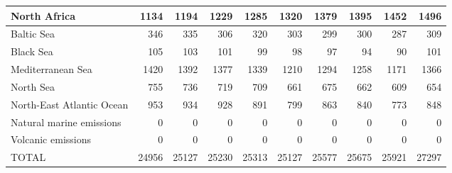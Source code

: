 \begin{table}
\begin{tabular}{|l|r|r|r|r|r|r|r|r|r|}
                  North Africa&   1134&   1194&   1229&   1285&   1320&   1379&   1395&   1452&   1496\\\hline
                    Baltic Sea&    346&    335&    306&    320&    303&    299&    300&    287&    309\\\hline
                     Black Sea&    105&    103&    101&     99&     98&     97&     94&     90&    101\\\hline
             Mediterranean Sea&   1420&   1392&   1377&   1339&   1210&   1294&   1258&   1171&   1366\\\hline
                     North Sea&    755&    736&    719&    709&    661&    675&    662&    609&    654\\\hline
     North-East Atlantic Ocean&    953&    934&    928&    891&    799&    863&    840&    773&    848\\\hline
      Natural marine emissions&      0&      0&      0&      0&      0&      0&      0&      0&      0\\\hline
            Volcanic emissions&      0&      0&      0&      0&      0&      0&      0&      0&      0\\\hline\hline
                         TOTAL&  24956&  25127&  25230&  25313&  25127&  25577&  25675&  25921&  27297\\\hline
 \end{tabular}
 \end{table}
 
 

